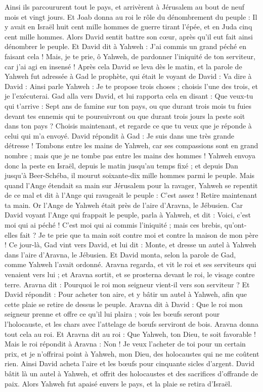 \begin{multicols}{2}
Ainsi ils parcoururent tout le pays, et arrivèrent à Jérusalem au bout de neuf mois et vingt jours.
Et Joab donna au roi le rôle du dénombrement du peuple : Il y avait en Israël huit cent mille hommes de guerre tirant l'épée, et en Juda cinq cent mille hommes.
Alors David sentit battre son cœur, après qu'il eut fait ainsi dénombrer le peuple. Et David dit à Yahweh : J'ai commis un grand péché en faisant cela ! Mais, je te prie, ô Yahweh, de pardonner l'iniquité de ton serviteur, car j'ai agi en insensé !
Après cela David se leva dès le matin, et la parole de Yahweh fut adressée à Gad le prophète, qui était le voyant de David :
Va dire à David : Ainsi parle Yahweh : Je te propose trois choses ; choisis l'une des trois, et je l’exécuterai.
Gad alla vers David, et lui rapporta cela en disant : Que veux-tu qui t'arrive : Sept ans de famine sur ton pays, ou que durant trois mois tu fuies devant tes ennemis qui te poursuivront ou que durant trois jours la peste soit dans ton pays ? Choisis maintenant, et regarde ce que tu veux que je réponde à celui qui m'a envoyé.
David répondit à Gad : Je suis dans une très grande détresse ! Tombons entre les mains de Yahweh, car ses compassions sont en grand nombre ; mais que je ne tombe pas entre les mains des hommes !
Yahweh envoya donc la peste en Israël, depuis le matin jusqu'au temps fixé ; et depuis Dan jusqu'à Beer-Schéba, il mourut soixante-dix mille hommes parmi le peuple.
Mais quand l'Ange étendait sa main sur Jérusalem pour la ravager, Yahweh se repentit de ce mal et dit à l'Ange qui ravageait le peuple : C'est assez ! Retire maintenant ta main. Or l'Ange de Yahweh était près de l'aire d'Aravna, le Jébusien.
Car David voyant l'Ange qui frappait le peuple, parla à Yahweh, et dit : Voici, c'est moi qui ai péché ! C’est moi qui ai commis l'iniquité ; mais ces brebis, qu'ont-elles fait ? Je te prie que ta main soit contre moi et contre la maison de mon père !
Ce jour-là, Gad vint vers David, et lui dit : Monte, et dresse un autel à Yahweh dans l'aire d'Aravna, le Jébusien.
Et David monta, selon la parole de Gad, comme Yahweh l'avait ordonné.
Aravna regarda, et vit le roi et ses serviteurs qui venaient vers lui ; et Aravna sortit, et se prosterna devant le roi, le visage contre terre.
Aravna dit : Pourquoi le roi mon seigneur vient-il vers son serviteur ? Et David répondit : Pour acheter ton aire, et y bâtir un autel à Yahweh, afin que cette plaie se retire de dessus le peuple.
Aravna dit à David : Que le roi mon seigneur prenne et offre ce qu'il lui plaira ; vois les bœufs seront pour l'holocauste, et les chars avec l’attelage de bœufs serviront de bois.
Aravna donna tout cela au roi. Et Aravna dit au roi : Que Yahweh, ton Dieu, te soit favorable !
Mais le roi répondit à Aravna : Non ! Je veux l’acheter de toi pour un certain prix, et je n'offrirai point à Yahweh, mon Dieu, des holocaustes qui ne me coûtent rien. Ainsi David acheta l'aire et les bœufs pour cinquante sicles d'argent.
David bâtit là un autel à Yahweh, et offrit des holocaustes et des sacrifices d’offrande de paix. Alors Yahweh fut apaisé envers le pays, et la plaie se retira d’Israël.
\PPE{}
\end{multicols}
